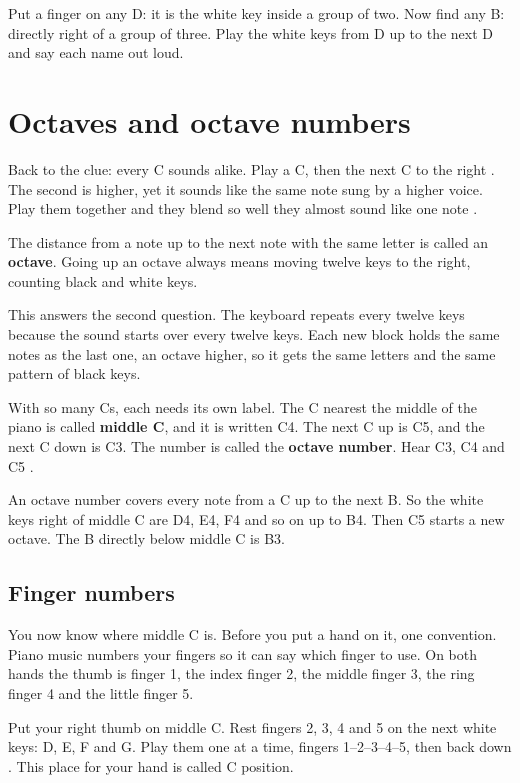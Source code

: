 \begin{tryitbox}
Put a finger on any D: it is the white key inside a group of two. Now find any B: directly right of a group of three. Play the white keys from D up to the next D and say each name out loud.
\end{tryitbox}

\section{Octaves and octave numbers}

Back to the clue: every C sounds alike. Play a C, then the next C to the right . The second is higher, yet it sounds like the same note sung by a higher voice. Play them together and they blend so well they almost sound like one note .

The distance from a note up to the next note with the same letter is called an \textbf{octave}. Going up an octave always means moving twelve keys to the right, counting black and white keys.

This answers the second question. The keyboard repeats every twelve keys because the sound starts over every twelve keys. Each new block holds the same notes as the last one, an octave higher, so it gets the same letters and the same pattern of black keys.

With so many Cs, each needs its own label. The C nearest the middle of the piano is called \textbf{middle C}, and it is written C4. The next C up is C5, and the next C down is C3. The number is called the \textbf{octave number}. Hear C3, C4 and C5 .

An octave number covers every note from a C up to the next B. So the white keys right of middle C are D4, E4, F4 and so on up to B4. Then C5 starts a new octave. The B directly below middle C is B3.

\subsection*{Finger numbers}

You now know where middle C is. Before you put a hand on it, one convention. Piano music numbers your fingers so it can say which finger to use. On both hands the thumb is finger 1, the index finger 2, the middle finger 3, the ring finger 4 and the little finger 5.

\begin{tryitbox}
Put your right thumb on middle C. Rest fingers 2, 3, 4 and 5 on the next white keys: D, E, F and G. Play them one at a time, fingers 1--2--3--4--5, then back down . This place for your hand is called C position.
\end{tryitbox}

